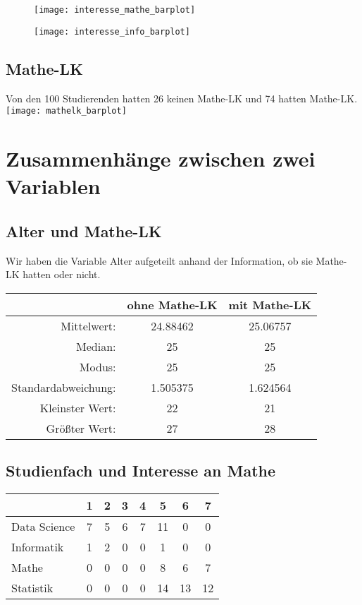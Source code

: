 \documentclass[paper=a4,                 %
               fontsize=12pt,            %
               parskip=half,             %
               ngerman,                 %
               ]{scrartcl}
\begin{document}
\begin{figure}[h]
   \begin{minipage}[b]{.4\linewidth}
      \texttt{[image: interesse\_mathe\_barplot]}
   \end{minipage}
   \hspace{.1\linewidth}%
   \begin{minipage}[b]{.4\linewidth} %
	\texttt{[image: interesse\_info\_barplot]}
   \end{minipage}
\end{figure}

\subsection{Mathe-LK}
Von den 100 Studierenden hatten 26 keinen Mathe-LK und 74 hatten Mathe-LK. \\
\texttt{[image: mathelk\_barplot]}

\newpage
\section{Zusammenhänge zwischen zwei Variablen}
\subsection{Alter und Mathe-LK}
Wir haben die Variable Alter aufgeteilt anhand der Information, ob sie Mathe-LK hatten oder nicht. \newline
\begin{tabular}{r|c|c}
& ohne Mathe-LK & mit Mathe-LK \\
\hline
Mittelwert: & 24.88462 & 25.06757 \\
Median:  & 25 & 25 \\
Modus: &  25 & 25\\
Standardabweichung: & 1.505375 & 1.624564\\
Kleinster Wert: & 22 & 21\\
Größter Wert: & 27 & 28\\
\end{tabular}

\newpage
\subsection{Studienfach und Interesse an Mathe}
\begin{tabular}{l||c|c|c|c|c|c|c}
& 1 & 2 & 3 & 4 & 5 & 6 & 7 \\
\hline
Data Science & 7 & 5 & 6 & 7 &11 & 0 & 0\\
Informatik  &  1 & 2 & 0 & 0 & 1&  0&  0\\
Mathe     &    0 & 0 & 0 & 0 & 8 & 6 & 7\\
Statistik     &0  &0 & 0 & 0 &14 &13& 12\\
\end{tabular}
\end{document}

